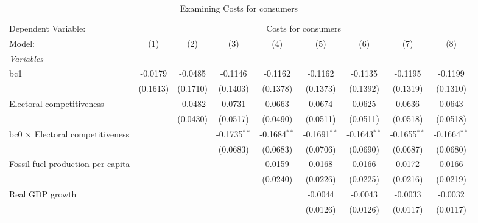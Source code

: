 
\begin{table}[htbp]
   \caption{Examining Costs for consumers}
   \centering
   \begin{tabular}{lcccccccc}
      \tabularnewline \midrule \midrule
      Dependent Variable: & \multicolumn{8}{c}{Costs for consumers}\\
      Model:                                  & (1)      & (2)      & (3)            & (4)            & (5)            & (6)            & (7)            & (8)\\  
      \midrule
      \emph{Variables}\\
      bc1                                     & -0.0179  & -0.0485  & -0.1146        & -0.1162        & -0.1162        & -0.1135        & -0.1195        & -0.1199\\   
                                              & (0.1613) & (0.1710) & (0.1403)       & (0.1378)       & (0.1373)       & (0.1392)       & (0.1319)       & (0.1310)\\   
      Electoral competitiveness               &          & -0.0482  & 0.0731         & 0.0663         & 0.0674         & 0.0625         & 0.0636         & 0.0643\\   
                                              &          & (0.0430) & (0.0517)       & (0.0490)       & (0.0511)       & (0.0511)       & (0.0518)       & (0.0518)\\   
      bc0 $\times$ Electoral competitiveness  &          &          & -0.1735$^{**}$ & -0.1684$^{**}$ & -0.1691$^{**}$ & -0.1643$^{**}$ & -0.1655$^{**}$ & -0.1664$^{**}$\\   
                                              &          &          & (0.0683)       & (0.0683)       & (0.0706)       & (0.0690)       & (0.0687)       & (0.0680)\\   
      Fossil fuel production per capita       &          &          &                & 0.0159         & 0.0168         & 0.0166         & 0.0172         & 0.0166\\   
                                              &          &          &                & (0.0240)       & (0.0226)       & (0.0225)       & (0.0216)       & (0.0219)\\   
      Real GDP growth                         &          &          &                &                & -0.0044        & -0.0043        & -0.0033        & -0.0032\\   
                                              &          &          &                &                & (0.0126)       & (0.0126)       & (0.0117)       & (0.0117)\\   

\end{tabular}
\end{table}
